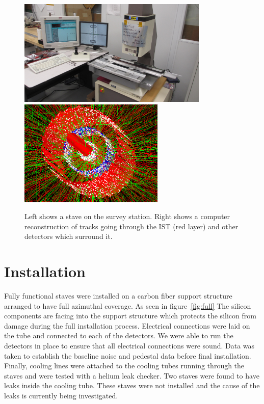 \documentclass[1p,12pt]{elsarticle}
\begin{document}
\begin{figure}[h]
\begin{center}
\includegraphics[height=2in, keepaspectratio=true, angle=0]{graphics/survey.jpg}
\includegraphics[height=2in, keepaspectratio=true, angle=0]{graphics/event.png}
\caption{Left shows a stave on the survey station.  Right shows a computer
reconstruction of tracks going through the IST (red layer) and other detectors which
surround it.
\label{fig:survey}}
\end{center}
\end{figure}
%
\section{Installation}
Fully functional staves were installed on a carbon fiber support structure
arranged to have full azimuthal coverage. As seen in figure~\ref{fig:full} The silicon components are facing
into the support structure which protects the silicon from damage during the
full installation process. Electrical connections were laid on the tube and
connected to each of the detectors. We were able to run the detectors in place
to ensure that all electrical connections were sound. Data was taken to establish
the baseline noise and pedestal data before final installation. Finally, cooling
lines were attached to the cooling tubes running through the staves and were
tested with a helium leak checker. Two staves were found to have leaks inside
the cooling tube. These staves were not installed and the cause of the leaks is
currently being investigated.
\end{document}
